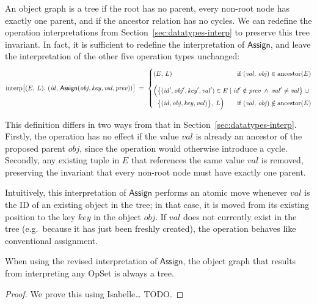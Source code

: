 An object graph is a tree if the root has no parent, every non-root node has exactly one parent, and if the ancestor relation has no cycles.
We can redefine the operation interpretations from Section~\ref{sec:datatypes-interp} to preserve this tree invariant.
In fact, it is sufficient to redefine the interpretation of $\mathsf{Assign}$, and leave the interpretation of the other five operation types unchanged:
\[
    \mathrm{interp}\big[(E,\, L),\, (\mathit{id},\, \mathsf{Assign}(\mathit{obj}, \mathit{key}, \mathit{val}, \mathit{prev})) \big] \;=\; \left\{
    \arraycolsep=0pt \def\arraystretch{1.5}
    \begin{array}{llllll}
        \multicolumn{2}{l}{(E,\, L)}
        & \text{if } (\mathit{val},\, \mathit{obj}) \in \mathrm{ancestor}(E) \\[8pt]
        \Big( & \multicolumn{2}{l}{
        \big\{ (\mathit{id}', \mathit{obj}', \mathit{key}', \mathit{val}') \in E \mid
        \mathit{id}' \notin \mathit{prev} \;\wedge\; \mathit{val}' \neq \mathit{val} \big\} \;\cup\;} \\
        & \big\{ (\mathit{id}, \mathit{obj}, \mathit{key}, \mathit{val}) \big\},\; L \Big) \qquad
        & \text{if } (\mathit{val},\, \mathit{obj}) \notin \mathrm{ancestor}(E)
    \end{array} \right.
\]

This definition differs in two ways from that in Section~\ref{sec:datatypes-interp}.
Firstly, the operation has no effect if the value $\mathit{val}$ is already an ancestor of the proposed parent $\mathit{obj}$, since the operation would otherwise introduce a cycle.
Secondly, any existing tuple in $E$ that references the same value $\mathit{val}$ is removed, preserving the invariant that every non-root node must have exactly one parent.

Intuitively, this interpretation of $\mathsf{Assign}$ performs an atomic move whenever $\mathit{val}$ is the ID of an existing object in the tree; in that case, it is moved from its existing position to the key $\mathit{key}$ in the object $\mathit{obj}$.
If $\mathit{val}$ does not currently exist in the tree (e.g.\ because it has just been freshly created), the operation behaves like conventional assignment.

\begin{proposition}\label{prop:tree-invariant}
    When using the revised interpretation of $\mathsf{Assign}$, the object graph that results from interpreting any OpSet is always a tree.
\end{proposition}
\begin{proof}
    We prove this using Isabelle{\dots} TODO.
\end{proof}

